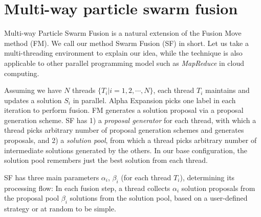 \section{Multi-way particle swarm fusion}
Multi-way Particle Swarm Fusion is a natural extension of the Fusion
Move method (FM). We call our method Swarm Fusion (SF) in short. Let us
take a multi-threading environment to explain our idea, while the
technique is also applicable to other parallel programming model such as
{\it MapReduce} in cloud computing.
%

Assuming we have $N$ threads $\{T_i | i=1, 2, \cdots, N\}$, each thread
$T_i$ maintains and updates a solution $S_i$ in parallel. Alpha
Expansion picks one label in each iteration to perform fusion. FM
generates a solution proposal via a proposal generation scheme.
SF has 1) a {\it proposal generator} for each thread, with which a thread
picks arbitrary number of proposal generation schemes and generates proposals, and 2) a
{\it solution pool}, from which a thread picks arbitrary number of
intermediate solutions generated by the others.
%
%
In our base configuration, the solution pool remembers just the best
solution from each thread.

SF has three main parameters $\alpha_i$, $\beta_i$ (for each thread
$T_i$), determining its processing flow: In each fusion step, a thread
collects $\alpha_i$ solution proposals from the proposal pool 
$\beta_i$ solutions from the solution pool, based on a user-defined
strategy or at random to be simple.
%


